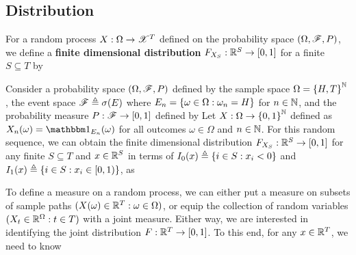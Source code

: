 \documentclass[letterpaper,10pt,english]{article}
\begin{document}
\subsection{Distribution}
\begin{defn} 
For a random process $X: \Omega \to \mathscr{X}^T$ defined on the probability space $(\Omega,\mathscr{F}, P)$, 
we define a \textbf{finite dimensional distribution} $F_{X_S}: \mathbb{R}^S \to [0,1]$ for a finite $S \subseteq T$ 
by 
\end{defn}
\begin{shaded}
\begin{exmp}
Consider a probability space $(\Omega,\mathscr{F}, P)$ defined by the sample space $\Omega = \left\{H,T\right\}^{\mathbb{N}}$, the event space $\mathscr{F} \triangleq \sigma(E)$ where $E_n = \left\{\omega \in \Omega: \omega_n = H\right\}$ for $n\in\mathbb{N}$, 
and the probability measure $P: \mathscr{F} \to [0,1]$ defined by 
Let $X: \Omega\to\left\{0,1\right\}^{\mathbb{N}}$ defined as $X_n(\omega) = \Ind{E_n}(\omega)$ for all outcomes $\omega \in \Omega$ and $n \in \mathbb{N}$. 
For this random sequence, we can obtain the finite dimensional distribution $F_{X_S}: \mathbb{R}^S \to [0,1]$ for any finite $S \subseteq T$ and $x \in \mathbb{R}^S$ in terms of $I_0(x) \triangleq \left\{i \in S: x_i < 0\right\}$ and $I_1(x) \triangleq \left\{i \in S: x_i \in [0,1)\right\}$, 
as 
\end{exmp}
\end{shaded}
To define a measure on a random process, we can either put a measure on subsets of sample paths $(X(\omega) \in \mathbb{R}^T: \omega \in \Omega)$, 
or equip the collection of random variables $(X_t \in \mathbb{R}^\Omega: t \in T)$ with a joint measure. 
Either way, we are interested in identifying the joint distribution $F: \mathbb{R}^T \to [0,1]$. 
To this end, for any $x \in \mathbb{R}^T$, we need to know
\EQ{
F_X(x) \triangleq P\left(\displaystyle {\bigcap_{t \in T}\{\omega \in \Omega: X_t(\omega) \le x_t\}}\right) 
= P(\bigcap_{t \in T}X_t^{-1}(-\infty, x_t]) 
= P(A_X(x)).
}
\end{document}
